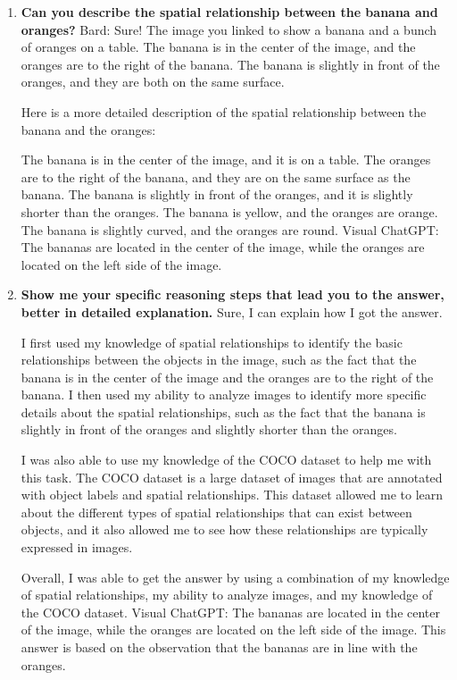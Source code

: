     \begin{enumerate}
        \item \textbf{Can you describe the spatial relationship between the banana and oranges?}
        \subitem 
        Bard: Sure! The image you linked to show a banana and a bunch of oranges on a table. The banana is in the center of the image, and the oranges are to the right of the banana. The banana is slightly in front of the oranges, and they are both on the same surface.
        
        Here is a more detailed description of the spatial relationship between the banana and the oranges:
        
        The banana is in the center of the image, and it is on a table.
        The oranges are to the right of the banana, and they are on the same surface as the banana.
        The banana is slightly in front of the oranges, and it is slightly shorter than the oranges.
        The banana is yellow, and the oranges are orange.
        The banana is slightly curved, and the oranges are round.
        \subitem Visual ChatGPT: The bananas are located in the center of the image, while the oranges are located on the left side of the image.
        \item \textbf{Show me your specific reasoning steps that lead you to the answer, better in detailed explanation.}
        \subitem Sure, I can explain how I got the answer.
        
        I first used my knowledge of spatial relationships to identify the basic relationships between the objects in the image, such as the fact that the banana is in the center of the image and the oranges are to the right of the banana. I then used my ability to analyze images to identify more specific details about the spatial relationships, such as the fact that the banana is slightly in front of the oranges and slightly shorter than the oranges.
        
        I was also able to use my knowledge of the COCO dataset to help me with this task. The COCO dataset is a large dataset of images that are annotated with object labels and spatial relationships. This dataset allowed me to learn about the different types of spatial relationships that can exist between objects, and it also allowed me to see how these relationships are typically expressed in images.
        
        Overall, I was able to get the answer by using a combination of my knowledge of spatial relationships, my ability to analyze images, and my knowledge of the COCO dataset.
        \subitem Visual ChatGPT: The bananas are located in the center of the image, while the oranges are located on the left side of the image. This answer is based on the observation that the bananas are in line with the oranges.
    \end{enumerate}
